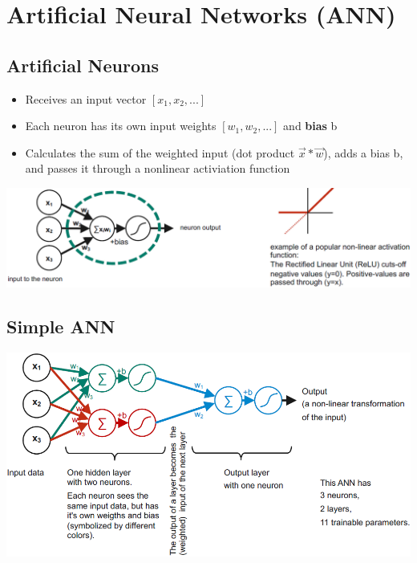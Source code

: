 \section{Artificial Neural Networks (ANN)}
\subsection{Artificial Neurons}
\begin{itemize}
    \item Receives an input vector $[x_1,x_2, ...]$
    \item Each neuron has its own input weights $[w_1, w_2, ...]$ and \textbf{bias} b
    \item Calculates the sum of the weighted input (dot product $\vec{x} * \vec{w}$), adds a bias b, and passes it through a nonlinear activiation function
\end{itemize}
\includegraphics[width=\linewidth]{./img/artificial_neurons.png}

\subsection{Simple ANN}
\includegraphics[width=\linewidth]{./img/ann.png}

